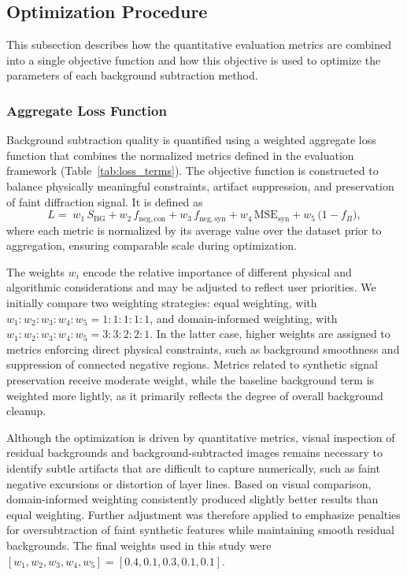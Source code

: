 \documentclass[iucr]{iucrjournals}
\begin{document}
\subsection{Optimization Procedure}

This subsection describes how the quantitative evaluation metrics are combined into a single objective function and how this objective is used to optimize the parameters of each background subtraction method.

\subsubsection{Aggregate Loss Function}

Background subtraction quality is quantified using a weighted aggregate loss function that combines the normalized metrics defined in the evaluation framework (Table~\ref{tab:loss_terms}). The objective function is constructed to balance physically meaningful constraints, artifact suppression, and preservation of faint diffraction signal. It is defined as
\begin{equation}
L =\;
w_1\, S_{\mathrm{BG}}
+ w_2\, f_{\mathrm{neg,con}}
+ w_3\, f_{\mathrm{neg,syn}}
+ w_4\, \mathrm{MSE}_{\mathrm{syn}}
+ w_5\, \bigl(1 - f_{B}\bigr),
\end{equation}
where each metric is normalized by its average value over the dataset prior to aggregation, ensuring comparable scale during optimization.

The weights $w_i$ encode the relative importance of different physical and algorithmic considerations and may be adjusted to reflect user priorities. We initially compare two weighting strategies: equal weighting, with $w_1 : w_2 : w_3 : w_4 : w_5 = 1 : 1 : 1 : 1 : 1$, and domain-informed weighting, with $w_1 : w_2 : w_3 : w_4 : w_5 = 3 : 3 : 2 : 2 : 1$. In the latter case, higher weights are assigned to metrics enforcing direct physical constraints, such as background smoothness and suppression of connected negative regions. Metrics related to synthetic signal preservation receive moderate weight, while the baseline background term is weighted more lightly, as it primarily reflects the degree of overall background cleanup.

Although the optimization is driven by quantitative metrics, visual inspection of residual backgrounds and background-subtracted images remains necessary to identify subtle artifacts that are difficult to capture numerically, such as faint negative excursions or distortion of layer lines. Based on visual comparison, domain-informed weighting consistently produced slightly better results than equal weighting. Further adjustment was therefore applied to emphasize penalties for oversubtraction of faint synthetic features while maintaining smooth residual backgrounds. The final weights used in this study were $[w_1, w_2, w_3, w_4, w_5] = [0.4, 0.1, 0.3, 0.1, 0.1]$.
\end{document}
